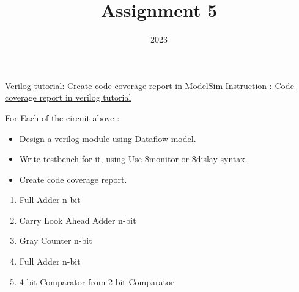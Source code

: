\documentclass{vhdl-assignment}
\title{Assignment 5}
\date{2023}
\begin{document}
\maketitle
\thispagestyle{fancy}

\begin{problem}{Verilog tutorial: Create code coverage report in ModelSim}
    Instruction : \href{https://youtu.be/vkzd5ckQ5ZQ}{Code coverage report in verilog tutorial}
\end{problem}

\begin{problem}{}
    For Each of the circuit above :
    \begin{itemize}
        \item Design a verilog module using Dataflow model.
        \item Write testbench for it, using Use \$monitor or \$dislay syntax.
        \item Create code coverage report.
    \end{itemize}

    \begin{enumerate}
        \item Full Adder n-bit
        \item Carry Look Ahead Adder n-bit
        \item Gray Counter n-bit
        \item Full Adder n-bit
        \item 4-bit Comparator from 2-bit Comparator
    \end{enumerate}
\end{problem}
\end{document}
